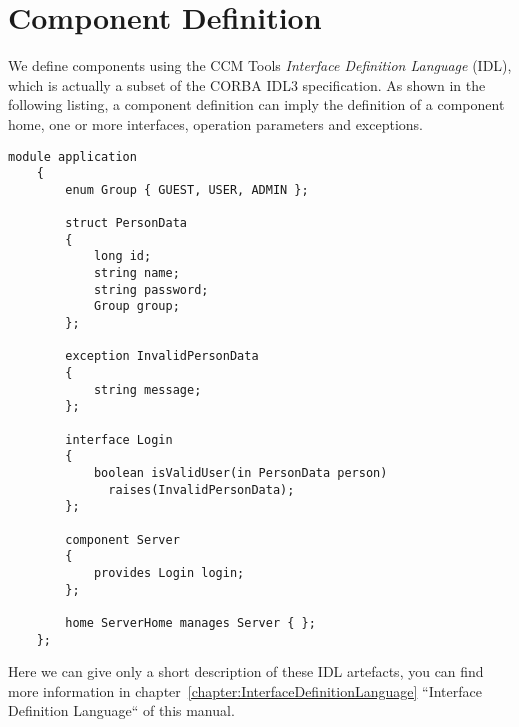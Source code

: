 \section{Component Definition}
\label{section:ComponentDefinition}

We define components using the CCM Tools {\it Interface Definition Language}
(IDL), which is actually a subset of the CORBA IDL3 specification.
As shown in the following listing, a component definition can imply the
definition of a component home, one or more interfaces, operation parameters and
exceptions. 

\begin{footnotesize}
\begin{lstlisting}[language=IDL]
    module application
    {
        enum Group { GUEST, USER, ADMIN };

        struct PersonData
        {
            long id;
            string name;
            string password;
            Group group;
        };

        exception InvalidPersonData
        {
            string message;
        };

        interface Login
        {
            boolean isValidUser(in PersonData person)
              raises(InvalidPersonData);
        };

        component Server
        {
            provides Login login; 
        };

        home ServerHome manages Server { };
    };
\end{lstlisting}
\end{footnotesize}

\newpage

Here we can give only a short description of these IDL artefacts, you can find 
more information in chapter~\ref{chapter:InterfaceDefinitionLanguage} 
``Interface Definition Language`` of this manual.

